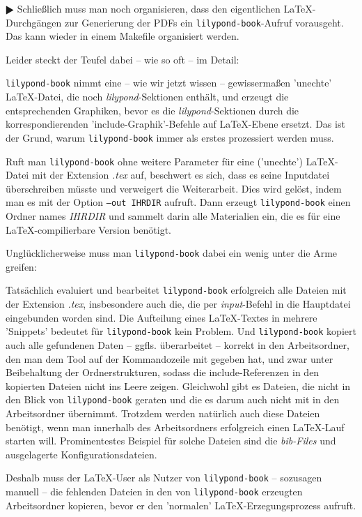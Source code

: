 $\RHD$ Schließlich muss man noch organisieren, dass den eigentlichen
\LaTeX-Durchgängen zur Generierung der PDFs ein \texttt{lilypond-book}-Aufruf
vorausgeht. Das kann wieder in einem Makefile organisiert werden.

Leider steckt der Teufel dabei -- wie so oft -- im Detail: 

\label{LilyPondGraphics}\texttt{lilypond-book} nimmt eine -- wie wir jetzt
wissen -- gewissermaßen 'unechte' \LaTeX-Datei, die noch
\textit{lilypond}-Sektionen enthält, und erzeugt die entsprechenden Graphiken,
bevor es die \textit{lilypond}-Sektionen durch die korrespondierenden
'include-Graphik'-Befehle auf \LaTeX-Ebene ersetzt. Das ist der Grund, warum
\texttt{lilypond-book} immer als erstes prozessiert werden muss.

Ruft man \texttt{lilypond-book} ohne weitere Parameter für eine ('unechte')
\LaTeX-Datei mit der Extension \textit{.tex} auf, beschwert es sich, dass es seine
Inputdatei überschreiben müsste und verweigert die Weiterarbeit. Dies wird
gelöst, indem man es mit der Option \texttt{--out IHRDIR} aufruft. Dann erzeugt
\texttt{lilypond-book} einen Ordner names \textit{IHRDIR} und sammelt darin
alle Materialien ein, die es für eine \LaTeX-compilierbare Version benötigt.

Unglücklicherweise muss man \texttt{lilypond-book} dabei ein wenig unter die Arme
greifen:

Tatsächlich evaluiert und bearbeitet \texttt{lilypond-book} erfolgreich alle
Dateien mit der Extension \textit{.tex}, insbesondere auch die, die per
\textit{input}-Befehl in die Hauptdatei eingebunden worden sind. Die Aufteilung
eines LaTeX-Textes in mehrere 'Snippets' bedeutet für \texttt{lilypond-book} kein
Problem. Und \texttt{lilypond-book} kopiert auch alle gefundenen Daten -- ggfls.
überarbeitet -- korrekt in den Arbeitsordner, den man dem Tool auf der
Kommandozeile mit gegeben hat, und zwar unter Beibehaltung der Ordnerstrukturen,
sodass die include-Referenzen in den kopierten Dateien nicht ins Leere zeigen.
Gleichwohl gibt es Dateien, die nicht in den Blick von \texttt{lilypond-book}
geraten und die es darum auch nicht mit in den Arbeitsordner übernimmt. Trotzdem
werden natürlich auch diese Dateien benötigt, wenn man innerhalb des
Arbeitsordners erfolgreich einen \LaTeX-Lauf starten will. Prominentestes
Beispiel für solche Dateien sind die \textit{bib-Files} und ausgelagerte
Konfigurationsdateien.

Deshalb muss der \LaTeX-User als Nutzer von \texttt{lilypond-book} -- sozusagen
manuell -- die fehlenden Dateien in den von \texttt{lilypond-book} erzeugten
Arbeitsordner kopieren, bevor er den 'normalen' \LaTeX-Erzegungsprozess aufruft.

